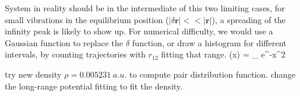 \documentclass[11pt]{revtex4}
\begin{document}
System in reality should be in the intermediate of this two limiting cases, for small vibrations in the equilibrium position ($|\delta \bm r| << |\bm r|$), a spreading of the infinity peak is likely to show up. 
For numerical difficulty, we would use a Gaussian function to replace the $\delta$ function, or draw a histogram for different intervals, by counting trajectories with $r_{12}$ fitting that range.  
\be \delta(x) = \lim_{\alpha \rightarrow \infty} \sqrt{\frac{2\alpha}{\pi}} e^{-\alpha x^2} \ee   
 

try new density $\rho = 0.005231~a. u.$ to compute pair distribution function.   
change the long-range potential fitting to fit the density. 
\end{document}
